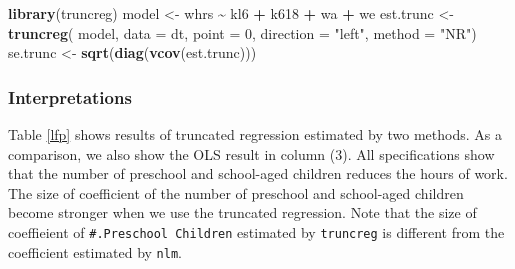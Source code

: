\documentclass[
  12pt,
]{article}
\newenvironment{Shaded}{\begin{snugshade}}{\end{snugshade}}
\newcommand{\DataTypeTok}[1]{\textcolor[rgb]{0.13,0.29,0.53}{#1}}
\newcommand{\DecValTok}[1]{\textcolor[rgb]{0.00,0.00,0.81}{#1}}
\newcommand{\KeywordTok}[1]{\textcolor[rgb]{0.13,0.29,0.53}{\textbf{#1}}}
\newcommand{\NormalTok}[1]{#1}
\newcommand{\OperatorTok}[1]{\textcolor[rgb]{0.81,0.36,0.00}{\textbf{#1}}}
\newcommand{\StringTok}[1]{\textcolor[rgb]{0.31,0.60,0.02}{#1}}
\begin{document}
\begin{Shaded}
\begin{Highlighting}[]
\KeywordTok{library}\NormalTok{(truncreg)}
\NormalTok{model \textless{}{-}}\StringTok{ }\NormalTok{whrs }\OperatorTok{\textasciitilde{}}\StringTok{ }\NormalTok{kl6 }\OperatorTok{+}\StringTok{ }\NormalTok{k618 }\OperatorTok{+}\StringTok{ }\NormalTok{wa }\OperatorTok{+}\StringTok{ }\NormalTok{we}
\NormalTok{est.trunc \textless{}{-}}\StringTok{ }\KeywordTok{truncreg}\NormalTok{(}
\NormalTok{  model, }\DataTypeTok{data =}\NormalTok{ dt, }\DataTypeTok{point =} \DecValTok{0}\NormalTok{, }\DataTypeTok{direction =} \StringTok{"left"}\NormalTok{, }\DataTypeTok{method =} \StringTok{"NR"}\NormalTok{)}
\NormalTok{se.trunc \textless{}{-}}\StringTok{ }\KeywordTok{sqrt}\NormalTok{(}\KeywordTok{diag}\NormalTok{(}\KeywordTok{vcov}\NormalTok{(est.trunc)))}
\end{Highlighting}
\end{Shaded}

\hypertarget{interpretations}{%
\subsubsection{Interpretations}\label{interpretations}}

Table \ref{lfp} shows results of truncated regression estimated by two methods.
As a comparison, we also show the OLS result in column (3).
All specifications show that the number of preschool and school-aged children reduces the hours of work.
The size of coefficient of the number of preschool and school-aged children become stronger
when we use the truncated regression.
Note that the size of coeffieient of \texttt{\#.Preschool\ Children} estimated by \texttt{truncreg} is different from
the coefficient estimated by \texttt{nlm}.
\end{document}
